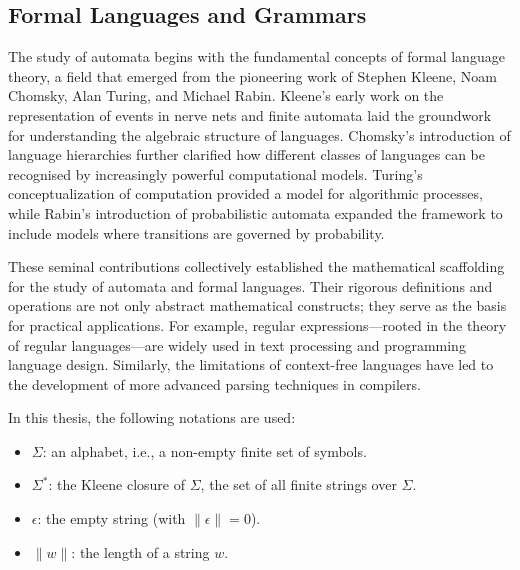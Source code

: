 \subsection{Formal Languages and Grammars}
\label{subsec:formal-languages-and-grammars}


The study of automata begins with the fundamental concepts of formal language theory, a field that emerged from the pioneering work of Stephen Kleene, Noam Chomsky, Alan Turing, and Michael Rabin. Kleene's early work on the representation of events in nerve nets and finite automata \cite{kleene1956representation} laid the groundwork for understanding the algebraic structure of languages. Chomsky’s introduction of language hierarchies \cite{chomsky1956three} further clarified how different classes of languages can be recognised by increasingly powerful computational models. Turing's conceptualization of computation \cite{hopcroft2006introduction} provided a model for algorithmic processes, while Rabin's introduction of probabilistic automata \cite{rabin1963probabilistic} expanded the framework to include models where transitions are governed by probability. 

These seminal contributions collectively established the mathematical scaffolding for the study of automata and formal languages. Their rigorous definitions and operations are not only abstract mathematical constructs; they serve as the basis for practical applications. For example, regular expressions—rooted in the theory of regular languages—are widely used in text processing and programming language design. Similarly, the limitations of context-free languages have led to the development of more advanced parsing techniques in compilers.



\begin{notation}[Symbols]
In this thesis, the following notations are used:
\begin{itemize}
    \item $\Sigma$: an alphabet, i.e., a non-empty finite set of symbols.
    \item $\Sigma^\ast$: the Kleene closure of $\Sigma$, the set of all finite strings over $\Sigma$.
    \item $\epsilon$: the empty string (with $\|\epsilon\| = 0$).
    \item $\|w\|$: the length of a string $w$.
\end{itemize}
\end{notation}

